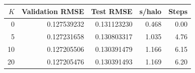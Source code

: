 \begin{tabular}{rrrrr}
\toprule
$K$ & Validation RMSE & Test RMSE & s/halo & Steps \\
\midrule
0 & 0.127539232 & 0.131123230 & 0.468 & 0.00 \\
5 & 0.127231658 & 0.130803317 & 1.035 & 4.76 \\
10 & 0.127205506 & 0.130391479 & 1.166 & 6.15 \\
20 & 0.127205476 & 0.130391493 & 1.169 & 6.20 \\
\bottomrule
\end{tabular}
